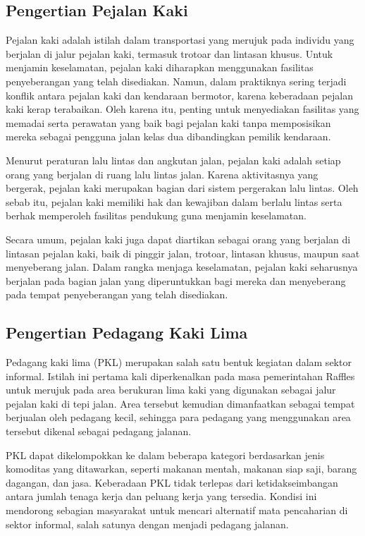 \documentclass[../rumukota.tex]{subfiles}
\begin{document}
\subsection{Pengertian Pejalan Kaki}%
\label{sub:pengertian_pejalan_kaki}

Pejalan kaki adalah istilah dalam transportasi yang merujuk pada individu yang berjalan di jalur pejalan kaki, termasuk trotoar dan lintasan khusus. Untuk menjamin keselamatan, pejalan kaki diharapkan menggunakan fasilitas penyeberangan yang telah disediakan. Namun, dalam praktiknya sering terjadi konflik antara pejalan kaki dan kendaraan bermotor, karena keberadaan pejalan kaki kerap terabaikan. Oleh karena itu, penting untuk menyediakan fasilitas yang memadai serta perawatan yang baik bagi pejalan kaki tanpa memposisikan mereka sebagai pengguna jalan kelas dua dibandingkan pemilik kendaraan.

Menurut peraturan lalu lintas dan angkutan jalan, pejalan kaki adalah setiap orang yang berjalan di ruang lalu lintas jalan. Karena aktivitasnya yang bergerak, pejalan kaki merupakan bagian dari sistem pergerakan lalu lintas. Oleh sebab itu, pejalan kaki memiliki hak dan kewajiban dalam berlalu lintas serta berhak memperoleh fasilitas pendukung guna menjamin keselamatan.

Secara umum, pejalan kaki juga dapat diartikan sebagai orang yang berjalan di lintasan pejalan kaki, baik di pinggir jalan, trotoar, lintasan khusus, maupun saat menyeberang jalan. Dalam rangka menjaga keselamatan, pejalan kaki seharusnya berjalan pada bagian jalan yang diperuntukkan bagi mereka dan menyeberang pada tempat penyeberangan yang telah disediakan.

\subsection{Pengertian Pedagang Kaki Lima}%
\label{sub:pengertian_pedagang_kaki_lima}

Pedagang kaki lima (PKL) merupakan salah satu bentuk kegiatan dalam sektor informal. Istilah ini pertama kali diperkenalkan pada masa pemerintahan Raffles untuk merujuk pada area berukuran lima kaki yang digunakan sebagai jalur pejalan kaki di tepi jalan. Area tersebut kemudian dimanfaatkan sebagai tempat berjualan oleh pedagang kecil, sehingga para pedagang yang menggunakan area tersebut dikenal sebagai pedagang jalanan.

PKL dapat dikelompokkan ke dalam beberapa kategori berdasarkan jenis komoditas yang ditawarkan, seperti makanan mentah, makanan siap saji, barang dagangan, dan jasa. Keberadaan PKL tidak terlepas dari ketidakseimbangan antara jumlah tenaga kerja dan peluang kerja yang tersedia. Kondisi ini mendorong sebagian masyarakat untuk mencari alternatif mata pencaharian di sektor informal, salah satunya dengan menjadi pedagang jalanan.
\end{document}
